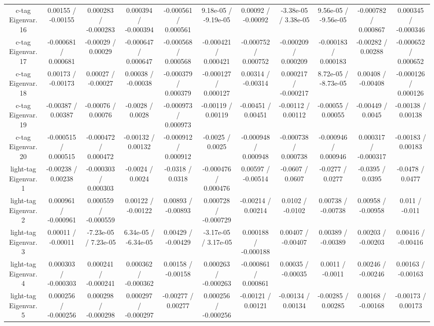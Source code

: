 {\begin{landscape}
\begin{longtable}{@{\extracolsep{\fill}}| *{11}{c|}}
  c-tag Eigenvar. 16 & 0.00155 / -0.00155 & 0.000283 / -0.000283 & 0.000394 / -0.000394 & -0.000561 / 0.000561 & 9.18e-05 / -9.19e-05 & 0.00092 / -0.00092 & -3.38e-05 / 3.38e-05 & 9.56e-05 / -9.56e-05 & -0.000782 / 0.000867 & 0.000345 / -0.000346 \\ 
  c-tag Eigenvar. 17 & -0.000681 / 0.000681 & -0.00029 / 0.00029 & -0.000647 / 0.000647 & -0.000568 / 0.000568 & -0.000421 / 0.000421 & -0.000752 / 0.000752 & -0.000209 / 0.000209 & -0.000183 / 0.000183 & -0.00282 / 0.00288 & -0.000652 / 0.000652 \\ 
  c-tag Eigenvar. 18 & 0.00173 / -0.00173 & 0.00027 / -0.00027 & 0.00038 / -0.00038 & -0.000379 / 0.000379 & -0.000127 / 0.000127 & 0.00314 / -0.00314 & 0.000217 / -0.000217 & 8.72e-05 / -8.73e-05 & 0.00408 / -0.00408 & -0.000126 / 0.000126 \\ 
  c-tag Eigenvar. 19 & -0.00387 / 0.00387 & -0.00076 / 0.00076 & -0.0028 / 0.0028 & -0.000973 / 0.000973 & -0.00119 / 0.00119 & -0.00451 / 0.00451 & -0.00112 / 0.00112 & -0.00055 / 0.00055 & -0.00449 / 0.0045 & -0.00138 / 0.00138 \\ 
  c-tag Eigenvar. 20 & -0.000515 / 0.000515 & -0.000472 / 0.000472 & -0.00132 / 0.00132 & -0.000912 / 0.000912 & -0.0025 / 0.0025 & -0.000948 / 0.000948 & -0.000738 / 0.000738 & -0.000946 / 0.000946 & 0.000317 / -0.000317 & -0.00183 / 0.00183 \\ 
  light-tag Eigenvar. 1 & -0.00238 / 0.00238 & -0.000303 / 0.000303 & -0.0024 / 0.0024 & -0.0318 / 0.0318 & -0.000476 / 0.000476 & 0.00597 / -0.00514 & -0.0607 / 0.0607 & -0.0277 / 0.0277 & -0.0395 / 0.0395 & -0.0478 / 0.0477 \\ 
  light-tag Eigenvar. 2 & 0.000961 / -0.000961 & 0.000559 / -0.000559 & 0.00122 / -0.00122 & 0.00893 / -0.00893 & 0.000728 / -0.000729 & -0.00214 / 0.00214 & 0.0102 / -0.0102 & 0.00738 / -0.00738 & 0.00958 / -0.00958 & 0.011 / -0.011 \\ 
  light-tag Eigenvar. 3 & 0.00011 / -0.00011 & -7.23e-05 / 7.23e-05 & 6.34e-05 / -6.34e-05 & 0.00429 / -0.00429 & -3.17e-05 / 3.17e-05 & 0.000188 / -0.000188 & 0.00407 / -0.00407 & 0.00389 / -0.00389 & 0.00203 / -0.00203 & 0.00416 / -0.00416 \\ 
  light-tag Eigenvar. 4 & 0.000303 / -0.000303 & 0.000241 / -0.000241 & 0.000362 / -0.000362 & 0.00158 / -0.00158 & 0.000263 / -0.000263 & -0.000861 / 0.000861 & 0.00035 / -0.00035 & 0.0011 / -0.0011 & 0.00246 / -0.00246 & 0.00163 / -0.00163 \\ 
  light-tag Eigenvar. 5 & 0.000256 / -0.000256 & 0.000298 / -0.000298 & 0.000297 / -0.000297 & -0.00277 / 0.00277 & 0.000256 / -0.000256 & -0.00121 / 0.00121 & -0.00134 / 0.00134 & -0.00285 / 0.00285 & 0.00168 / -0.00168 & -0.00173 / 0.00173 \\ 

\end{longtable}
\end{landscape}}
